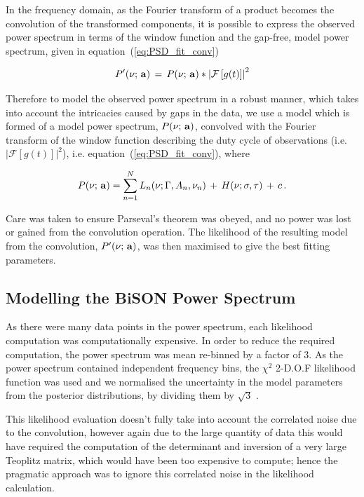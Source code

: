 In the frequency domain, as the Fourier transform of a product becomes the convolution of the transformed components, it is possible to express the observed power spectrum in terms of the window function and the gap-free, model power spectrum, given in equation~(\ref{eq:PSD_fit_conv})

\begin{equation}
P'(\nu; \,{\bf a}) \, = \, P(\nu; \,{\bf a}) * \left|\mathcal{F}\left[g(t)\right]\right|^2
\label{eq:PSD_fit_conv}
\end{equation}

Therefore to model the observed power spectrum in a robust manner, which takes into account the intricacies caused by gaps in the data, we use a model which is formed of a model power spectrum, $P(\nu; \,{\bf a})$, convolved with the Fourier transform of the window function describing the duty cycle of observations (i.e. $\left|\mathcal{F}\left[g(t)\right]\right|^2$), i.e. equation~(\ref{eq:PSD_fit_conv}), where


\begin{equation}
P(\nu; \,{\bf a}) = \sum_{n=1}^{N} L_n(\nu; \Gamma, A_n, \nu_n) \, + \, H(\nu; \sigma, \tau) \, + \, c \, .
\label{eq:PSD_model}
\end{equation}

Care was taken to ensure Parseval's theorem was obeyed, and no power was lost or gained from the convolution operation. The likelihood of the resulting model from the convolution, $P'(\nu; \,{\bf a})$, was then maximised to give the best fitting parameters.





\subsection{Modelling the BiSON Power Spectrum}\label{sec:BiSON_reults}

As there were many data points in the power spectrum, each likelihood computation was computationally expensive. In order to reduce the required computation, the power spectrum was mean re-binned by a factor of 3. As the power spectrum contained independent frequency bins, the $\chi^2$ 2-D.O.F likelihood function was used and we normalised the uncertainty in the model parameters from the posterior distributions, by dividing them by $\sqrt{3}$ \citep{appourchaux_maximum_2003}. 

This likelihood evaluation doesn't fully take into account the correlated noise due to the convolution, however again due to the large quantity of data this would have required the computation of the determinant and inversion of a very large Teoplitz matrix, which would have been too expensive to compute; hence the pragmatic approach was to ignore this correlated noise in the likelihood calculation.

